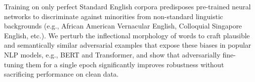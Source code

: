 Training on only perfect Standard English corpora predisposes pre-trained neural networks to discriminate against minorities from non-standard linguistic backgrounds (e.g., African American Vernacular English, Colloquial Singapore English, etc.). We perturb the inflectional morphology of words to craft plausible and semantically similar adversarial examples that expose these biases in popular NLP models, e.g., BERT and Transformer, and show that adversarially fine-tuning them for a single epoch significantly improves robustness without sacrificing performance on clean data.
